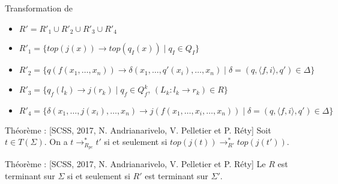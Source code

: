 \begin{frame}{Transformation de \pctrs}
  \begin{itemize}
  \item $R' = R'_1 \cup R'_2 \cup R'_3 \cup R'_4$
  \item $R'_1 = \{top(j(x)) \rightarrow top(q_I(x)) \mid q_I \in Q_I\}$
  \item $R'_2= \{q(f(x_1,\ldots,x_n))\rightarrow \delta(x_1,\ldots,q'(x_i),\ldots,x_n) \mid \delta=(q, \langle f,i \rangle, q') \in \Delta\}$
  \item $R'_3= \{q_f(l_k) \rightarrow j(r_k) \mid q_f \in Q_f^k,\, (L_k : l_k \rightarrow r_k) \in R\}$
  \item $R'_4= \{\delta(x_1,\ldots,j(x_i),\ldots,x_n)\rightarrow j(f(x_1,\ldots,x_i,\ldots,x_n)) \mid \delta=(q, \langle f,i \rangle, q') \in \Delta\}$
  \end{itemize}
  \begin{alertblock}{Théorème : {\small[SCSS, 2017, N. Andrianarivelo, V. Pelletier et P. Réty]}}
    Soit $t \in T(\Sigma)$. On a $t \rightarrow^*_{R_{pc}} t'$ si et seulement si $top(j(t)) \rightarrow^*_{R'} top(j(t'))$.
  \end{alertblock}
  \begin{alertblock}{Théorème : {\small[SCSS, 2017, N. Andrianarivelo, V. Pelletier et P. Réty]}}
    Le \pctrs $R$ est terminant sur $\Sigma$ si et seulement si $R'$ est terminant sur $\Sigma'$.
  \end{alertblock}
\end{frame}


